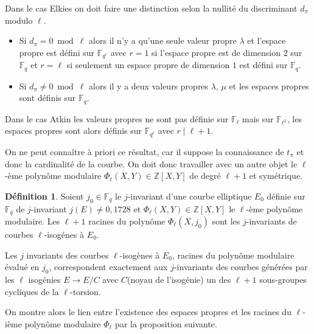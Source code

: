 \documentclass[10pt,a4paper]{book}
\theoremstyle{plain}
\theoremstyle{definition}
\theoremstyle{definition}
\theoremstyle{definition}
\theoremstyle{definition}
\newtheorem{defi}[thm]{Définition}
\theoremstyle{remark}
\theoremstyle{remark}
\begin{document}
	Dans le cas Elkies on doit faire une distinction selon la nullité du discriminant $d_{\pi}$ modulo $\ell$. 
\begin{itemize}	
	\item Si $d_{\pi}=0 \bmod \ell$ alors il n'y a qu'une seule valeur propre $\lambda$ et l'espace propre est défini sur $\mathbb{F}_{q^r}$ avec $r=1$ si l'espace propre est de dimension $2$ sur $\mathbb{F}_q$ et $r=\ell$ si seulement un espace propre de dimension $1$ est défini sur $\mathbb{F}_q$.
	\item Si $d_{\pi} \neq 0 \bmod \ell$ alors il y a deux valeurs propres $\lambda$, $\mu$ et les espaces propres sont définis sur $\mathbb{F}_q$.
\end{itemize}

	Dans le cas Atkin les valeurs propres ne sont pas définie sur $\mathbb{F}_\ell$ mais sur $\mathbb{F}_{\ell^2}$, les espaces propres sont alors définis sur $\mathbb{F}_{q^r}$ avec $r \mid \ell+1$.
	
	
	On ne peut connaître à priori ce résultat, car il suppose la connaissance de $t_{\pi}$ et donc la cardinalité de la courbe. On doit donc travailler avec un autre objet le $\ell$-ème polynôme modulaire $\Phi_{\ell}(X,Y) \in \mathbb{Z}[X,Y] $ de degré $\ell+1$ et symétrique. 
 
\begin{defi}
Soient $j_0 \in \mathbb{F}_q$ le $j$-invariant d'une courbe elliptique $E_0$ définie sur $\mathbb{F}_q$ de $j$-invariant $j(E) \neq 0,1728$ et  $\Phi_{\ell}(X,Y) \in \mathbb{Z}[X,Y] $ le $\ell$-ème polynôme modulaire. Les $\ell+1$ racines du polynôme $\Phi_{\ell}(X,j_0)$ sont les $j$-invariants de courbes $\ell$-isogénes à $E_0$. 
\end{defi} 
Les $j$ invariants des courbes $\ell$-isogènes à $E_0$, racines du polynôme modulaire évalué en $j_0$, correspondent exactement aux $j$-invariants des  courbes générées par les $\ell$ isogénies $E \to E/C$ avec $C$(noyau de l'isogénie) un des $\ell+1$ sous-groupes cycliques de la $\ell$-torsion. 

On montre alors le lien entre l'existence des espaces propres et les racines du $\ell$-ième polynôme modulaire $\Phi_{\ell}$ par la proposition suivante. 

 
 
 
\end{document}
